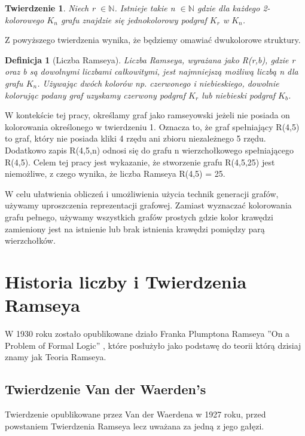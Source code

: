 \documentclass[11pt]{article}
\newtheorem{theorem}{Twierdzenie}
\newtheorem{definition}{Definicja}[section]
\begin{document}
\begin{theorem}
Niech r $\in \mathbb{N}$. Istnieje takie n $\in \mathbb{N}$  gdzie dla każdego 2-kolorowego $\mathit{K}_{n}$ grafu znajdzie się jednokolorowy podgraf $\mathit{K}_{r}$ w $\mathit{K}_{n}$.  \cite{theory} 
\end{theorem}

Z powyższego twierdzenia wynika, że będziemy omawiać dwukolorowe struktury. 

\begin{definition}[Liczba Ramseya]
Liczba Ramseya, wyrażana jako R(r,b), gdzie r oraz b są dowolnymi liczbami całkowitymi, jest najmniejszą możliwą liczbą n dla grafu $\mathit{K}_{n}$. Używając dwóch kolorów np. czerwonego i niebieskiego, dowolnie kolorując podany graf uzyskamy czerwony podgraf $\mathit{K}_{r}$ lub niebieski podgraf $\mathit{K}_{b}$.  \cite{theory} 
\end{definition}

W kontekście tej pracy, określamy graf jako ramseyowski jeżeli nie posiada on kolorowania określonego w twierdzeniu 1. Oznacza to, że graf spełniający R(4,5) to graf, który nie posiada kliki 4 rzędu ani zbioru niezależnego 5 rzędu. Dodatkowo zapis R(4,5,n) odnosi się do grafu n wierzchołkowego spełniającego R(4,5). 
Celem tej pracy jest wykazanie, że stworzenie grafu R(4,5,25) jest niemożliwe, z czego wynika, że liczba Ramseya R(4,5) = 25.

W celu ułatwienia obliczeń i umożliwienia użycia technik generacji grafów, używamy uproszczenia reprezentacji grafowej. Zamiast wyznaczać kolorowania grafu pełnego, używamy wszystkich grafów prostych gdzie kolor krawędzi zamieniony jest na istnienie lub brak istnienia krawędzi pomiędzy parą wierzchołków.

\section{Historia liczby i Twierdzenia Ramseya}

W 1930 roku zostało opublikowane działo Franka Plumptona Ramseya ''On a Problem of Formal Logic''\cite{ramsey} , które posłużyło jako podstawę do teorii którą dzisiaj znamy jak Teoria Ramseya. 


\subsection{Twierdzenie Van der Waerden's}
Twierdzenie opublikowane przez Van der Waerdena w 1927 roku, przed powstaniem Twierdzenia Ramseya lecz uważana za jedną z jego gałęzi. 
\end{document}
